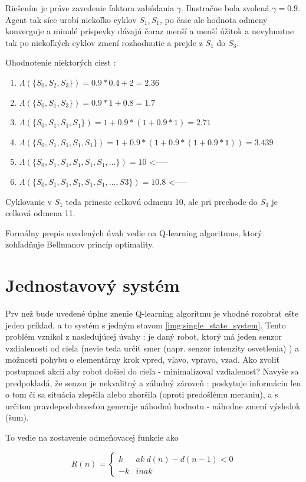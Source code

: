 Riešením je práve zavedenie faktora zabúdania $\gamma$. Ilustračne
bola zvolená $\gamma = 0.9$. Agent tak síce urobí niekoľko cyklov $S_1, S_1$,
po čase ale hodnota odmeny konverguje a minulé príspevky dávajú čoraz menší
a menší úžitok a nevyhnutne tak po niekoľkých cyklov zmení rozhodnutie a prejde
z $S_1$ do $S_3$.

Ohodnotenie niektorých ciest :
\begin{enumerate}
  \item $\Lambda(\{S_0, S_2, S_3\}) = 0.9*0.4 + 2  = 2.36$
  \item $\Lambda(\{S_0, S_1, S_3\}) = 0.9*1 + 0.8 = 1.7$
  \item $\Lambda(\{S_0, S_1, S_1, S_1\}) = 1 + 0.9*(1 + 0.9*1) = 2.71 $
  \item $\Lambda(\{S_0, S_1, S_1, S_1, S_1\}) = 1 + 0.9*(1 + 0.9*(1 + 0.9*1)) = 3.439$
  \item $\Lambda(\{S_0, S_1, S_1, S_1, S_1, S_1, ...\}) = 10$ <-----
  \item $\Lambda(\{S_0, S_1, S_1, S_1, S_1, S_1, ..., S3\}) = 10.8$ <-----
\end{enumerate}

Cyklovanie v $S_1$ teda prinesie celkovú odmenu 10, ale pri prechode do $S_3$ je celková
odmena 11.

Formálny prepis uvedených úvah vedie na Q-learning algoritmus, ktorý zohľadňuje Bellmanov princíp optimality.


\section{Jednostavový systém}

Prv než bude uvedené úplne znenie Q-learning algoritmu je vhodné rozobrať ešte
jeden príklad, a to systém s jedným stavom \ref{img:single_state_system}.
Tento problém vznikol z nasledujúcej úvahy : je daný robot, ktorý má jeden senzor
vzdialenosti od cieľa (nevie teda určiť smer (napr. senzor intenzity osvetlenia) ) a možnosti pohybu o elementárny krok
vpred, vľavo, vpravo, vzad. Ako zvoliť postupnosť akcií aby robot došiel do cieľa - minimalizoval vzdialenosť?
Navyše sa predpokladá, že senzor je nekvalitný a záludný zároveň : poskytuje
informáciu len o tom či sa situácia zlepšila alebo zhoršila (oproti predošlému meraniu),
a s určitou pravdepodobnosťou generuje náhodnú hodnotu - náhodne zmení výsledok (šum).

To vedie na zostavenie odmeňovacej funkcie ako

\begin{equation}
R(n) =
\left\{
	\begin{array}{ll}
		k  & ak \ d(n) - d(n-1) < 0 \\
    -k & inak
	\end{array}
\right.
\label{eq:q_nano_r_func_simple}
\end{equation}

